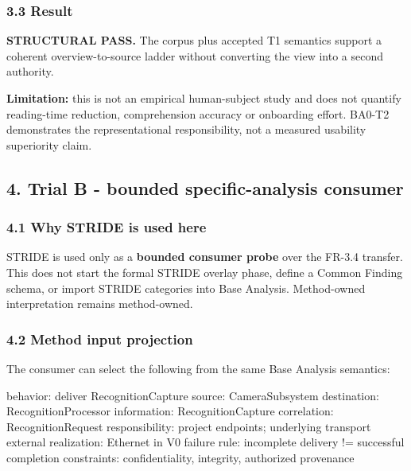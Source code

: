 \documentclass[
  10pt,
  a4paper,
]{article}
\newenvironment{Shaded}{}{}
\newcommand{\NormalTok}[1]{#1}
\begin{document}
\subsubsection{3.3 Result}\label{33-result}

\textbf{STRUCTURAL PASS.} The corpus plus accepted T1 semantics support
a coherent overview-to-source ladder without converting the view into a
second authority.

\textbf{Limitation:} this is not an empirical human-subject study and
does not quantify reading-time reduction, comprehension accuracy or
onboarding effort. BA0-T2 demonstrates the representational
responsibility, not a measured usability superiority claim.

\subsection{4. Trial B - bounded specific-analysis
consumer}\label{4-trial-b---bounded-specific-analysis-consumer}

\subsubsection{4.1 Why STRIDE is used
here}\label{41-why-stride-is-used-here}

STRIDE is used only as a \textbf{bounded consumer probe} over the FR-3.4
transfer. This does not start the formal STRIDE overlay phase, define a
Common Finding schema, or import STRIDE categories into Base Analysis.
Method-owned interpretation remains method-owned.

\subsubsection{4.2 Method input
projection}\label{42-method-input-projection}

The consumer can select the following from the same Base Analysis
semantics:

\begin{Shaded}
\begin{Highlighting}[]
\NormalTok{behavior:        deliver RecognitionCapture}
\NormalTok{source:          CameraSubsystem}
\NormalTok{destination:     RecognitionProcessor}
\NormalTok{information:     RecognitionCapture}
\NormalTok{correlation:     RecognitionRequest}
\NormalTok{responsibility:  project endpoints; underlying transport external}
\NormalTok{realization:     Ethernet in V0}
\NormalTok{failure rule:    incomplete delivery != successful completion}
\NormalTok{constraints:     confidentiality, integrity, authorized provenance}
\end{Highlighting}
\end{Shaded}
\end{document}
